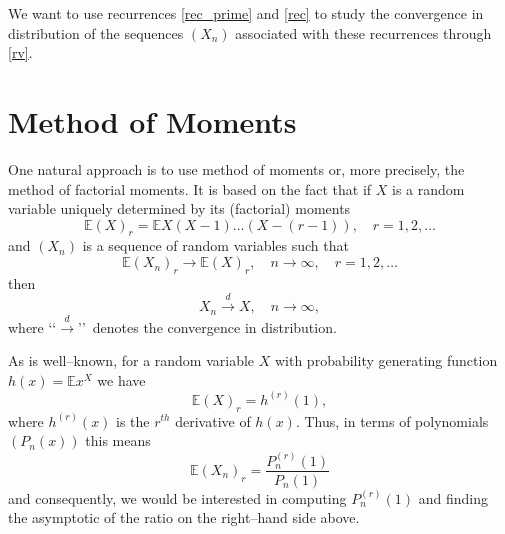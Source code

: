 \documentclass[10pt]{amsart}
\numberwithin{subcase}{case}
\begin{document}
We want to use recurrences \eqref{rec_prime} and \eqref{rec} to study the convergence in distribution of the sequences $(X_n)$ associated with these recurrences through \eqref{rv}. 

\section{Method of Moments}
One natural approach is to use method of moments or, more precisely, the method of factorial moments. It is based on the fact that if $X$ is a random variable uniquely determined by its (factorial) moments 
\[{\mathbb{E}}(X)_r={\mathbb{E}} X(X-1)\dots(X-(r-1)), \quad r=1,2,\dots\]
and $(X_n)$ is a sequence of random variables such that 
\[{\mathbb{E}}(X_n)_r\longrightarrow{\mathbb{E}}(X)_r,\quad n\to\infty,\quad r=1,2,\dots\]
then 
\[X_n\stackrel d\longrightarrow X,\quad n\to\infty,\]
where \lq\lq$\stackrel d\longrightarrow$\rq\rq\ denotes the convergence in distribution.

As is well--known, for a random variable 
 $X$ with probability generating function $h(x)={\mathbb{E}} x^X$ we have 
\[{\mathbb{E}}(X)_r=h^{(r)}(1),\]
where $h^{(r)}(x)$ is the $r^{th}$ derivative of $h(x)$. 
Thus, in terms of polynomials $(P_n(x))$ this means
\[{\mathbb{E}}(X_n)_r=\frac{P_n^{(r)}(1)}{P_n(1)}\]
and consequently, we would be interested in computing $P_n^{(r)}(1)$ and finding the asymptotic of the ratio on the right--hand side above.
\end{document}
